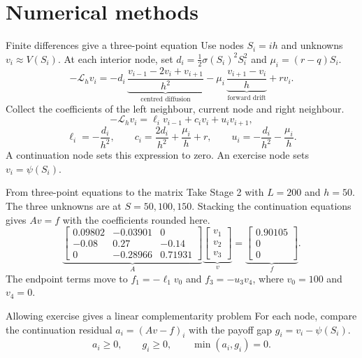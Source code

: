 \documentclass[aspectratio=169,11pt]{beamer}
\newcommand{\Lop}{\mathcal{L}}
\begin{document}
\section{Numerical methods}

\begin{frame}[t]{Finite differences give a three-point equation}
\small
Use nodes $S_i=ih$ and unknowns $v_i\approx V(S_i)$. At each interior node, set
$d_i=\tfrac12\sigma(S_i)^2 S_i^2$ and $\mu_i=(r-q)S_i$.
\[
-\Lop_h v_i
 =-d_i\,\underbrace{\frac{v_{i-1}-2v_i+v_{i+1}}{h^2}}_{\text{centred diffusion}}
  -\mu_i\,\underbrace{\frac{v_{i+1}-v_i}{h}}_{\text{forward drift}}
  +rv_i.
\]
Collect the coefficients of the left neighbour, current node and right neighbour.
\[
-\Lop_h v_i=\ell_i v_{i-1}+c_i v_i+u_i v_{i+1},
\]
\[
 \ell_i=-\frac{d_i}{h^2},\qquad
 c_i=\frac{2d_i}{h^2}+\frac{\mu_i}{h}+r,\qquad
 u_i=-\frac{d_i}{h^2}-\frac{\mu_i}{h}.
\]
A continuation node sets this expression to zero. An exercise node sets $v_i=\psi(S_i)$.
\end{frame}

\begin{frame}[t]{From three-point equations to the matrix}
\small
Take Stage 2 with $L=200$ and $h=50$. The three unknowns are at $S=50,100,150$.
Stacking the continuation equations gives $Av=f$ with the coefficients rounded here.
\[
 \underbrace{\begin{bmatrix}
 0.09802 & -0.03901 & 0\\
 -0.08 & 0.27 & -0.14\\
 0 & -0.28966 & 0.71931
 \end{bmatrix}}_{A}
 \underbrace{\begin{bmatrix}v_1\\v_2\\v_3\end{bmatrix}}_{v}
 =
 \underbrace{\begin{bmatrix}0.90105\\0\\0\end{bmatrix}}_{f}.
\]
The endpoint terms move to $f_1=-\ell_1v_0$ and $f_3=-u_3v_4$,
where $v_0=100$ and $v_4=0$.
\begin{block}{Allowing exercise gives a linear complementarity problem}
For each node, compare the continuation residual $a_i=(Av-f)_i$
with the payoff gap $g_i=v_i-\psi(S_i)$.
\[
 a_i\ge0,\qquad g_i\ge0,\qquad \min(a_i,g_i)=0.
\]
\end{block}
\end{frame}
\end{document}
